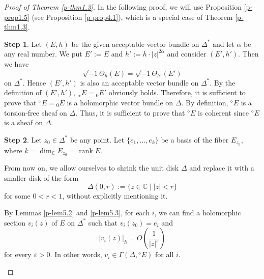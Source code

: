 \documentclass[12pt,twoside]{amsart}
\DeclareMathOperator{\rank}{rank}
\theoremstyle{definition}
\newtheorem{step}{Step}
\begin{document}
\begin{proof}[Proof of Theorem \ref{p-thm1.3}]

In the following proof, we will use Proposition \ref{p-prop1.5} 
(see Proposition \ref{p-prop4.1}), 
which is a special case of Theorem \ref{p-thm1.3}. 

\setcounter{step}{0}
\begin{step}\label{p-step1.3-1}
Let $(E, h)$ be the given acceptable vector bundle on $\Delta^*$ and 
let $\alpha$ be any real number. 
We put $E':=E$ and $h':=h\cdot |z|^{2\alpha}$ and 
consider $(E', h')$. Then we have 
\[
\sqrt{-1}\Theta_h(E)=\sqrt{-1}\Theta_{h'}(E')
\] 
on $\Delta^*$. Hence $(E', h')$ is also an acceptable 
vector bundle on $\Delta^*$. 
By the definition of $(E', h')$, 
${}_\alpha E={}_0 E'$ obviously holds. Therefore, it is sufficient to 
prove that ${}^\diamond\! E={}_0 E$ is a holomorphic 
vector bundle on $\Delta$. By definition, 
${}^\diamond\!E$ is a torsion-free sheaf on $\Delta$. 
Thus, it is sufficient to prove that ${}^\diamond\! E$ is coherent 
since ${}^\diamond\! E$ 
is a sheaf on $\Delta$. 
\end{step}

\begin{step}\label{p-step1.3-2}
Let $z_0 \in \Delta^*$ be any point. 
Let $\{e_1, \ldots, e_k\}$ be a basis of 
the fiber $E_{z_0}$, where $k = \dim_{\mathbb{C}} E_{z_0} = \rank E$. 

From now on, we allow ourselves to shrink 
the unit disk $\Delta$ and replace it with a smaller disk of the form
\[
\Delta(0, r) := \{ z \in \mathbb{C} \mid |z| < r \}
\]
for some $0 < r < 1$, without explicitly mentioning it.

By Lemmas \ref{p-lem5.2} and \ref{p-lem5.3}, 
for each $i$, we can find a holomorphic section 
$v_i(z)$ of $E$ on $\Delta^*$ such 
that $v_i(z_0) = e_i$ and
\[
|v_i(z)|_h = O\left(\frac{1}{|z|^\varepsilon}\right)
\]
for every $\varepsilon > 0$. 
In other words, $v_i \in \Gamma(\Delta, {}^\diamond\! E)$ for all $i$.
\end{step}


\end{proof}
\end{document}

